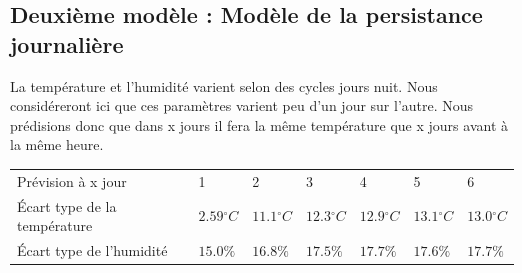 \documentclass[11pt,a4paper]{article}
\begin{document}

\subsection{Deuxième modèle : Modèle de la persistance journalière}
 La température et l'humidité varient selon des cycles jours nuit. Nous considéreront ici que ces paramètres varient peu d'un jour sur l'autre. Nous prédisions donc que dans x jours il fera la même température que x jours avant à la même heure. \\
 
\begin{tabular}{lllllll}\hline
\hline
Prévision à x jour                  &1                         &2                         &3                           &4                         &5                          &6 \\
Écart type de la température& $2.59{}^{\circ}C$& $11.1{}^{\circ}C$& $12.3{}^{\circ}C$& $12.9{}^{\circ}C$& $13.1{}^{\circ}C$& $13.0{}^{\circ}C$\\
Écart type de l'humidité       &  $ 15.0\% $         &  $ 16.8\% $         &  $ 17.5\% $        &  $ 17.7\% $         &  $ 17.6\% $         &  $ 17.7\% $\\
\hline 
\end{tabular}

\end{document}
